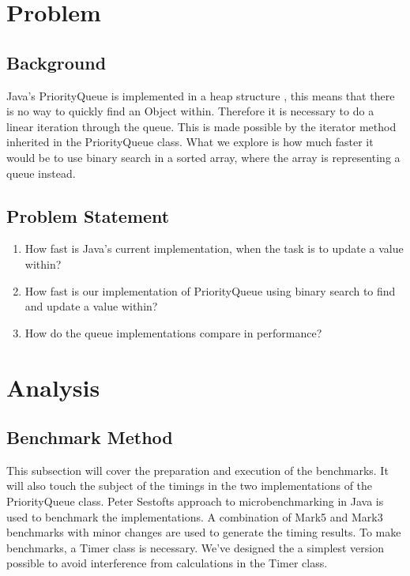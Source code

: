 \documentclass{article}
\begin{document}
\section{Problem}
\subsection{Background}
Java's PriorityQueue is implemented in a heap structure \cite{g4g_pq}, this means that there is no way to quickly find an Object within.
Therefore it is necessary to do a linear iteration through the queue. This is made possible by 
the iterator method inherited in the PriorityQueue class. What we explore is how much faster it would 
be to use binary search \cite{g4g_bs} in a sorted array, where the array is representing a queue instead.  
\subsection{Problem Statement}
\begin{enumerate}
    \item How fast is Java's current implementation, when the task is to update a value within?
    \item How fast is our implementation of PriorityQueue using binary search to find and update a value within?
    \item How do the queue implementations compare in performance?
\end{enumerate}


\section{Analysis}
\subsection{Benchmark Method} %
This subsection will cover the preparation and execution of the benchmarks.
It will also touch the subject of the timings in the two implementations
of the PriorityQueue class. Peter Sestofts approach to microbenchmarking in 
Java \cite{microbenchmarks7-8} \cite{microbenchmarks5} is used to benchmark the implementations. A combination of Mark5 and Mark3 
benchmarks with minor changes are used to generate the timing results. 
To make benchmarks, a Timer class is necessary. We've designed the a simplest
version possible to avoid interference from calculations in the Timer class.
\end{document}
